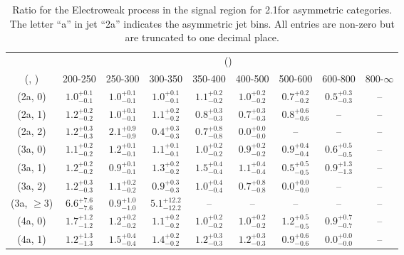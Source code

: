 \begin{table}[h!]
\tiny
\centering
\caption{Ratio for the Electroweak process in the signal region for 2.1\ifb for asymmetric categories. The letter ``a'' in jet \eg ``2a''  indicates the asymmetric jet bins. All entries are non-zero but are truncated to one decimal place.\label{tab:ratiosep_sig_ewk_asym}}
\begin{tabular}
{ccccccccc}
	\hline\hline
	& \multicolumn{8}{c}{\scalht (\gev)} \\ 
	 (\njet,  \nb) & 200-250 & 250-300 & 300-350 & 350-400 & 400-500 & 500-600 & 600-800 & 800-$\infty$ \\ [0.8ex] 
\hline
	(2a, 0) & $1.0^{+ 0.1 }_{- 0.1 }$ & $1.0^{+ 0.1 }_{- 0.1 }$ & $1.0^{+ 0.1 }_{- 0.1 }$ & $1.1^{+ 0.2 }_{- 0.2 }$ & $1.0^{+ 0.2 }_{- 0.2 }$ & $0.7^{+ 0.2 }_{- 0.2 }$ & $0.5^{+ 0.3 }_{- 0.3 }$ & -- \\[0.5ex] 
	(2a, 1) & $1.2^{+ 0.2 }_{- 0.2 }$ & $1.0^{+ 0.1 }_{- 0.1 }$ & $1.1^{+ 0.2 }_{- 0.2 }$ & $0.8^{+ 0.3 }_{- 0.3 }$ & $0.7^{+ 0.3 }_{- 0.3 }$ & $0.8^{+ 0.6 }_{- 0.6 }$ & -- & -- \\[0.5ex] 
	(2a, 2) & $1.2^{+ 0.3 }_{- 0.3 }$ & $2.1^{+ 0.9 }_{- 0.9 }$ & $0.4^{+ 0.3 }_{- 0.3 }$ & $0.7^{+ 0.8 }_{- 0.8 }$ & $0.0^{+ 0.0 }_{- 0.0 }$ & -- & -- & -- \\[0.5ex] 
	(3a, 0) & $1.1^{+ 0.2 }_{- 0.2 }$ & $1.2^{+ 0.1 }_{- 0.1 }$ & $1.1^{+ 0.1 }_{- 0.1 }$ & $1.0^{+ 0.2 }_{- 0.2 }$ & $0.9^{+ 0.2 }_{- 0.2 }$ & $0.9^{+ 0.4 }_{- 0.4 }$ & $0.6^{+ 0.5 }_{- 0.5 }$ & -- \\[0.5ex] 
	(3a, 1) & $1.2^{+ 0.2 }_{- 0.2 }$ & $0.9^{+ 0.1 }_{- 0.1 }$ & $1.3^{+ 0.2 }_{- 0.2 }$ & $1.5^{+ 0.4 }_{- 0.4 }$ & $1.1^{+ 0.4 }_{- 0.4 }$ & $0.5^{+ 0.5 }_{- 0.5 }$ & $0.9^{+ 1.3 }_{- 1.3 }$ & -- \\[0.5ex] 
	(3a, 2) & $1.2^{+ 0.3 }_{- 0.3 }$ & $1.1^{+ 0.2 }_{- 0.2 }$ & $0.9^{+ 0.3 }_{- 0.3 }$ & $1.0^{+ 0.4 }_{- 0.4 }$ & $0.7^{+ 0.8 }_{- 0.8 }$ & $0.0^{+ 0.0 }_{- 0.0 }$ & -- & -- \\[0.5ex] 
	(3a, $\ge3$) & $6.6^{+ 7.6 }_{- 7.6 }$ & $0.9^{+ 1.0 }_{- 1.0 }$ & $5.1^{+ 12.2 }_{- 12.2 }$ & -- & -- & -- & -- & -- \\[0.5ex] 
	(4a, 0) & $1.7^{+ 1.2 }_{- 1.2 }$ & $1.2^{+ 0.2 }_{- 0.2 }$ & $1.1^{+ 0.2 }_{- 0.2 }$ & $1.0^{+ 0.2 }_{- 0.2 }$ & $1.0^{+ 0.2 }_{- 0.2 }$ & $1.2^{+ 0.5 }_{- 0.5 }$ & $0.9^{+ 0.7 }_{- 0.7 }$ & -- \\[0.5ex] 
	(4a, 1) & $1.2^{+ 1.3 }_{- 1.3 }$ & $1.5^{+ 0.4 }_{- 0.4 }$ & $1.4^{+ 0.2 }_{- 0.2 }$ & $1.2^{+ 0.3 }_{- 0.3 }$ & $1.2^{+ 0.3 }_{- 0.3 }$ & $0.9^{+ 0.6 }_{- 0.6 }$ & $0.0^{+ 0.0 }_{- 0.0 }$ & -- \\[0.5ex] 

\end{tabular}
\end{table}

